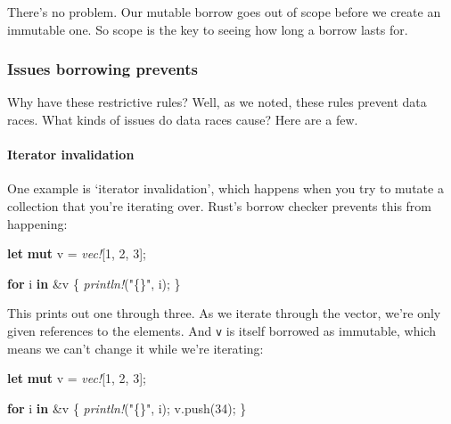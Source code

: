 \documentclass[a4paper,]{book}
\newenvironment{Shaded}{\begin{snugshade}}{\end{snugshade}}
\newcommand{\KeywordTok}[1]{\textcolor[rgb]{0.13,0.29,0.53}{\textbf{{#1}}}}
\newcommand{\DecValTok}[1]{\textcolor[rgb]{0.00,0.00,0.81}{{#1}}}
\newcommand{\StringTok}[1]{\textcolor[rgb]{0.31,0.60,0.02}{{#1}}}
\newcommand{\PreprocessorTok}[1]{\textcolor[rgb]{0.56,0.35,0.01}{\textit{{#1}}}}
\newcommand{\NormalTok}[1]{{#1}}
\let\oldparagraph\paragraph
\renewcommand{\paragraph}[1]{\oldparagraph{#1}\mbox{}}
\begin{document}
There's no problem. Our mutable borrow goes out of scope before we
create an immutable one. So scope is the key to seeing how long a borrow
lasts for.

\subsubsection{Issues borrowing
prevents}\label{issues-borrowing-prevents}

Why have these restrictive rules? Well, as we noted, these rules prevent
data races. What kinds of issues do data races cause? Here are a few.

\paragraph{Iterator invalidation}\label{iterator-invalidation}

One example is `iterator invalidation', which happens when you try to
mutate a collection that you're iterating over. Rust's borrow checker
prevents this from happening:

\begin{Shaded}
\begin{Highlighting}[]
\KeywordTok{let} \KeywordTok{mut} \NormalTok{v = }\PreprocessorTok{vec!}\NormalTok{[}\DecValTok{1}\NormalTok{, }\DecValTok{2}\NormalTok{, }\DecValTok{3}\NormalTok{];}

\KeywordTok{for} \NormalTok{i }\KeywordTok{in} \NormalTok{&v \{}
    \PreprocessorTok{println!}\NormalTok{(}\StringTok{"\{\}"}\NormalTok{, i);}
\NormalTok{\}}
\end{Highlighting}
\end{Shaded}

This prints out one through three. As we iterate through the vector,
we're only given references to the elements. And \texttt{v} is itself
borrowed as immutable, which means we can't change it while we're
iterating:

\begin{Shaded}
\begin{Highlighting}[]
\KeywordTok{let} \KeywordTok{mut} \NormalTok{v = }\PreprocessorTok{vec!}\NormalTok{[}\DecValTok{1}\NormalTok{, }\DecValTok{2}\NormalTok{, }\DecValTok{3}\NormalTok{];}

\KeywordTok{for} \NormalTok{i }\KeywordTok{in} \NormalTok{&v \{}
    \PreprocessorTok{println!}\NormalTok{(}\StringTok{"\{\}"}\NormalTok{, i);}
    \NormalTok{v.push(}\DecValTok{34}\NormalTok{);}
\NormalTok{\}}
\end{Highlighting}
\end{Shaded}
\end{document}

